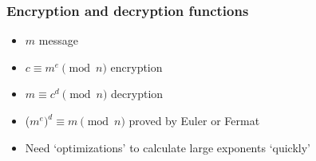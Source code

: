 \documentclass{beamer}
\begin{document}
\begin{frame}
	\frametitle{Encryption and decryption functions}
	\begin{itemize}
		\item $m$ message
		\item $c \equiv m^e \pmod{n}$ encryption
		\item $m \equiv c^d \pmod{n}$ decryption
		\item ($m^e)^d \equiv m \pmod{n}$ proved by Euler or Fermat
		\item Need `optimizations' to calculate large exponents
		      `quickly'
	\end{itemize}
\end{frame}
\end{document}
